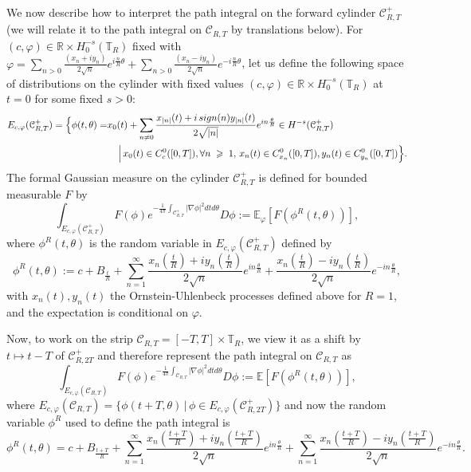 \documentclass[11pt]{amsart}
\numberwithin{equation}{section}
\theoremstyle{definition}
\renewcommand{\geq}{\;\geqslant\;}                   %
\newcommand{\R}{\mathbb{R}}
\def\E{\mathbb{E}}
\newcommand{\mc}{\mathcal}
\def\T{\mathbb{T}}
\begin{document}
We now describe how to interpret the path integral on the forward cylinder $\mathcal{C}_{R,T}^+$ (we will relate it to the path integral on $\mathcal{C}_{R,T}$ by translations below). For $(c,\varphi)\in \R\times H_0^{-s}(\T_R)$ fixed with $\varphi=\sum_{n>0}\frac{(x_n+iy_n)}{2\sqrt{n}}e^{i\frac{n}{R}\theta}+\sum_{n>0}\frac{(x_n-iy_n)}{2\sqrt{n}}e^{-i\frac{n}{R}\theta}$, 
 let us define the following space of distributions on the cylinder with fixed values $(c,\varphi)\in \R\times H_0^{-s}(\T_R)$ at $t=0$ for some fixed $s>0$:
 \[\begin{split}
  E_{c,\varphi}(\mc{C}^+_{R,T})=\Big\{ \phi(t,\theta)=& x_0(t)+ \sum_{n\not=0} \frac{x_{|n|}(t)+i\,{\rm sign}(n)y_{|n|}(t)}{2\sqrt{|n|}}e^{in\frac{\theta}{R}} \in H^{-s}(\mc{C}^+_{R,T})\\
 &  \quad \,\Big|\, x_0(t)\in C^0_{c}([0,T]), \forall n\geq 1,\,  x_n(t)\in C^0_{x_n}([0,T]), y_n(t)\in C^0_{y_n}([0,T])\Big\}.
 \end{split}\]
 The formal Gaussian measure on the cylinder $\mc{C}^+_{R,T}$ is defined for bounded measurable $F$ by 
 \[ \int_{E_{c,\varphi}(\mc{C}^+_{R,T})}F(\phi)e^{-\frac{1}{4\pi}\int_{\mc{C}^+_{R,T}}|\nabla \phi|^2dtd\theta}D\phi:= \E_\varphi[ F( \phi^R(t,\theta))],\]
 where  $\phi^R(t,\theta)$ is the random variable in $E_{c,\varphi}(\mc{C}^+_{R,T})$ defined by
 \[ \phi^R(t,\theta):=c+B_{\frac{t}{R}}+\sum_{n=1}^\infty \frac{x_n(\frac{t}{R})+iy_n(\frac{t}{R})}{2\sqrt{n}}e^{in\frac{\theta}{R}}+ 
 \frac{x_n(\frac{t}{R})-iy_n(\frac{t}{R})}{2\sqrt{n}}e^{-in\frac{\theta}{R}},\]
with $x_n(t),y_n(t)$ the Ornstein-Uhlenbeck processes defined above for $R=1$, and the expectation is conditional on $\varphi$.

 Now, to work on the strip $\mc{C}_{R,T}=[-T,T]\times \T_R$, we view it as a shift by $t\mapsto t-T$ of $\mc{C}^+_{R,2T}$ and therefore represent the path integral on $\mc{C}_{R,T}$ as 
 \[\int_{E_{c,\varphi}(\mc{C}_{R,T})}F(\phi)e^{-\frac{1}{4\pi}\int_{\mc{C}_{R,T}}|\nabla \phi|^2dtd\theta}D\phi:= 
 \E[ F( \phi^R(t,\theta))],\]
 where  $E_{c,\varphi}(\mc{C}_{R,T})=\{ \phi(t+T,\theta) \,|\, \phi \in  E_{c,\varphi}(\mc{C}^+_{R,2T})\}$ and now the random variable
 $\phi^R$ 
 used to define the path integral is 
 \[ \phi^R(t,\theta)=c+B_{\frac{t+T}{R}}+\sum_{n=1}^\infty \frac{x_n(\frac{t+T}{R})+iy_n(\frac{t+T}{R})}{2\sqrt{n}}e^{in\frac{\theta}{R}}+\sum_{n=1}^\infty \frac{x_n(\frac{t+T}{R})-iy_n(\frac{t+T}{R})}{2\sqrt{n}}e^{-in\frac{\theta}{R}}.\]




\end{document}
